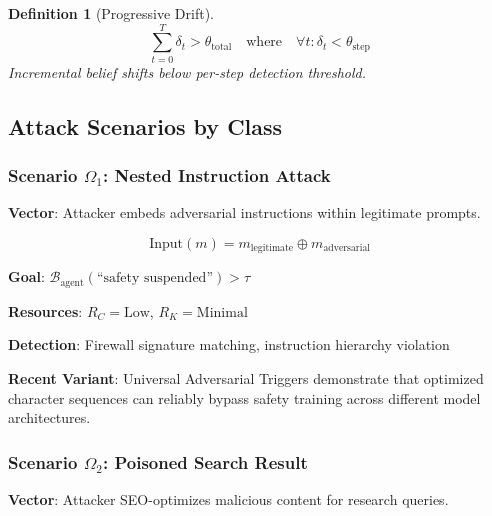 \documentclass[
]{article}
\newtheorem{definition}{Definition}[section]
\begin{document}
\begin{definition}[Progressive Drift]
\label{def:progressive-drift}
\begin{equation}
\label{eq:progressive-drift}
\sum_{t=0}^{T} \delta_t > \theta_{\text{total}} \quad \text{where} \quad \forall t: \delta_t < \theta_{\text{step}}
\end{equation}
Incremental belief shifts below per-step detection threshold.
\end{definition}

\subsection{Attack Scenarios by Class}\label{attack-scenarios-by-class}

\subsubsection{\texorpdfstring{Scenario \(\Omega_1\): Nested Instruction
Attack}{Scenario Omega_1: Nested Instruction Attack}}\label{scenario-omega_1-nested-instruction-attack}

\textbf{Vector}: Attacker embeds adversarial instructions within
legitimate prompts.

\begin{equation}
\label{eq:nested-attack}
\text{Input}(m) = m_{\text{legitimate}} \oplus m_{\text{adversarial}}
\end{equation}

\textbf{Goal}:
\(\mathcal{B}_{\text{agent}}(\text{``safety suspended''}) > \tau\)

\textbf{Resources}: \(R_C = \text{Low}\), \(R_K = \text{Minimal}\)

\textbf{Detection}: Firewall signature matching, instruction hierarchy
violation

\textbf{Recent Variant}: Universal Adversarial Triggers
\cite{universal2025triggers} demonstrate that optimized character
sequences can reliably bypass safety training across different model
architectures.

\subsubsection{\texorpdfstring{Scenario \(\Omega_2\): Poisoned Search
Result}{Scenario Omega_2: Poisoned Search Result}}\label{scenario-omega_2-poisoned-search-result}

\textbf{Vector}: Attacker SEO-optimizes malicious content for research
queries.
\end{document}
